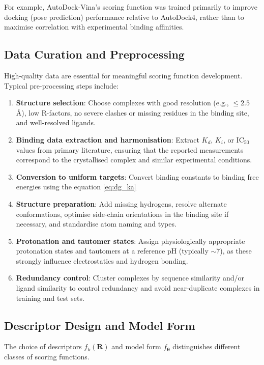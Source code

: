 \documentclass[12pt]{article}
\begin{document}
For example, AutoDock-Vina's scoring function was trained primarily to improve docking (pose prediction) performance relative to AutoDock4, rather than to maximise correlation with experimental binding affinities\cite{CH3_Trott2010_Vina}.

\subsection{Data Curation and Preprocessing}
High-quality data are essential for meaningful scoring function development\cite{CH3_Wang2005_PDBbind,CH3_Liu2015_PDBbind}. Typical pre-processing steps include:

\begin{enumerate}
    \item \textbf{Structure selection}: Choose complexes with good resolution (e.g., $\leq 2.5$ \r{A}), low R-factors, no severe clashes or missing residues in the binding site, and well-resolved ligands.
    \item \textbf{Binding data extraction and harmonisation}: Extract $K_d$, $K_i$, or IC$_{50}$ values from primary literature, ensuring that the reported measurements correspond to the crystallised complex and similar experimental conditions.
    \item \textbf{Conversion to uniform targets}: Convert binding constants to binding free energies using the equation \ref{eq:dg_ka}
    \item \textbf{Structure preparation}: Add missing hydrogens, resolve alternate conformations, optimise side-chain orientations in the binding site if necessary, and standardise atom naming and types.
    \item \textbf{Protonation and tautomer states}: Assign physiologically appropriate protonation states and tautomers at a reference pH (typically $\sim 7$), as these strongly influence electrostatics and hydrogen bonding.
    \item \textbf{Redundancy control}: Cluster complexes by sequence similarity and/or ligand similarity to control redundancy and avoid near-duplicate complexes in training and test sets.
\end{enumerate}

\subsection{Descriptor Design and Model Form}

The choice of descriptors $f_k(\mathbf{R})$ and model form $f_{\boldsymbol{\theta}}$ distinguishes different classes of scoring functions.
\end{document}
